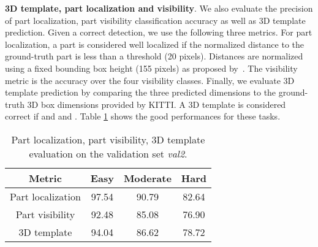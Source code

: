 \documentclass[10pt,twocolumn,letterpaper]{article}
\begin{document}
\textbf{3D template, part localization and visibility}. 
We also evaluate the precision of part localization, part visibility classification accuracy as well as 3D template prediction. Given a correct detection, we use the following three metrics. For part localization, a part is considered well localized if the normalized distance to the ground-truth part is less than a threshold (20 pixels). Distances are normalized using a fixed bounding box height (155 pixels) as proposed by~\cite{Zia3}. The visibility metric is the accuracy over the four visibility classes. Finally, we evaluate 3D template prediction by comparing the three predicted dimensions  to the ground-truth 3D box dimensions  provided by KITTI. A 3D template  is considered correct if  and  and . Table \ref{p_v_t} shows the good performances for these tasks.

\begin{table}[ht]
\centering
\begin{tabular}{|c|c|c|c|}
\hline
Metric & Easy & Moderate & Hard   \\ \hline
Part localization   & 97.54  & 90.79  & 82.64 \\
Part visibility     & 92.48  & 85.08  & 76.90  \\ 
3D template     & 94.04  & 86.62  & 78.72 \\ \hline
\end{tabular}
\vspace*{3mm}
\caption{Part localization, part visibility, 3D template evaluation on the validation set \textit{val2}.}
\label{p_v_t}
\end{table}
\end{document}
